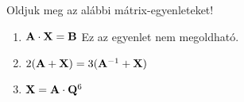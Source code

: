 \begin{exercise}{Oldjuk meg az alábbi mátrix-egyenleteket!}
{\begin{enumerate}
			      \tcbline
			\item $\mathbf{A} \cdot \mathbf{X} = \mathbf{B}$
			      Ez az egyenlet nem megoldható.

			      \tcbline
			\item $2(\mathbf{A} + \mathbf{X}) = 3(\mathbf{A}^{-1} + \mathbf{X})$

			      \tcbline
			\item $\mathbf{X} = \mathbf{A} \cdot \mathbf{Q}^{6}$
		\end{enumerate}
	}
\end{exercise}
